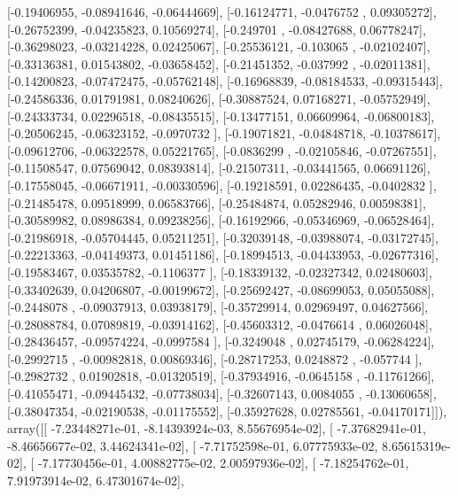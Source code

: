 \documentclass{article}
\begin{document}
       [-0.19406955, -0.08941646, -0.06444669],
       [-0.16124771, -0.0476752 ,  0.09305272],
       [-0.26752399, -0.04235823,  0.10569274],
       [-0.249701  , -0.08427688,  0.06778247],
       [-0.36298023, -0.03214228,  0.02425067],
       [-0.25536121, -0.103065  , -0.02102407],
       [-0.33136381,  0.01543802, -0.03658452],
       [-0.21451352, -0.037992  , -0.02011381],
       [-0.14200823, -0.07472475, -0.05762148],
       [-0.16968839, -0.08184533, -0.09315443],
       [-0.24586336,  0.01791981,  0.08240626],
       [-0.30887524,  0.07168271, -0.05752949],
       [-0.24333734,  0.02296518, -0.08435515],
       [-0.13477151,  0.06609964, -0.06800183],
       [-0.20506245, -0.06323152, -0.0970732 ],
       [-0.19071821, -0.04848718, -0.10378617],
       [-0.09612706, -0.06322578,  0.05221765],
       [-0.0836299 , -0.02105846, -0.07267551],
       [-0.11508547,  0.07569042,  0.08393814],
       [-0.21507311, -0.03441565,  0.06691126],
       [-0.17558045, -0.06671911, -0.00330596],
       [-0.19218591,  0.02286435, -0.0402832 ],
       [-0.21485478,  0.09518999,  0.06583766],
       [-0.25484874,  0.05282946,  0.00598381],
       [-0.30589982,  0.08986384,  0.09238256],
       [-0.16192966, -0.05346969, -0.06528464],
       [-0.21986918, -0.05704445,  0.05211251],
       [-0.32039148, -0.03988074, -0.03172745],
       [-0.22213363, -0.04149373,  0.01451186],
       [-0.18994513, -0.04433953, -0.02677316],
       [-0.19583467,  0.03535782, -0.1106377 ],
       [-0.18339132, -0.02327342,  0.02480603],
       [-0.33402639,  0.04206807, -0.00199672],
       [-0.25692427, -0.08699053,  0.05055088],
       [-0.2448078 , -0.09037913,  0.03938179],
       [-0.35729914,  0.02969497,  0.04627566],
       [-0.28088784,  0.07089819, -0.03914162],
       [-0.45603312, -0.0476614 ,  0.06026048],
       [-0.28436457, -0.09574224, -0.0997584 ],
       [-0.3249048 ,  0.02745179, -0.06284224],
       [-0.2992715 , -0.00982818,  0.00869346],
       [-0.28717253,  0.0248872 , -0.057744  ],
       [-0.2982732 ,  0.01902818, -0.01320519],
       [-0.37934916, -0.0645158 , -0.11761266],
       [-0.41055471, -0.09445432, -0.07738034],
       [-0.32607143,  0.0084055 , -0.13060658],
       [-0.38047354, -0.02190538, -0.01175552],
       [-0.35927628,  0.02785561, -0.04170171]]), array([[ -7.23448271e-01,  -8.14393924e-03,   8.55676954e-02],
       [ -7.37682941e-01,  -8.46656677e-02,   3.44624341e-02],
       [ -7.71752598e-01,   6.07775933e-02,   8.65615319e-02],
       [ -7.17730456e-01,   4.00882775e-02,   2.00597936e-02],
       [ -7.18254762e-01,   7.91973914e-02,   6.47301674e-02],
\end{document}
